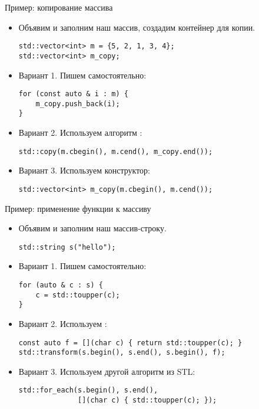 \documentclass{beamer}
\begin{document}
\begin{frame}[fragile]{Пример: копирование массива}
    \begin{itemize}
        \item Объявим и заполним наш массив, создадим контейнер для копии.
            \begin{lstlisting}
std::vector<int> m = {5, 2, 1, 3, 4};
std::vector<int> m_copy;
            \end{lstlisting}
        \item Вариант 1. Пишем самостоятельно:
            \begin{lstlisting}
for (const auto & i : m) {
    m_copy.push_back(i);
}
            \end{lstlisting}
        \item Вариант 2. Используем алгоритм :
            \begin{lstlisting}
std::copy(m.cbegin(), m.cend(), m_copy.end());
            \end{lstlisting}
        \item Вариант 3. Используем конструктор:
            \begin{lstlisting}
std::vector<int> m_copy(m.cbegin(), m.cend());
            \end{lstlisting}
    \end{itemize}
\end{frame}

\begin{frame}[fragile]{Пример: применение функции к массиву}
    \begin{itemize}
        \item Объявим и заполним наш массив-строку.
            \begin{lstlisting}
std::string s("hello");
            \end{lstlisting}
        \item Вариант 1. Пишем самостоятельно:
            \begin{lstlisting}
for (auto & c : s) {
    c = std::toupper(c);
}
            \end{lstlisting}
        \item Вариант 2. Используем :
            \begin{lstlisting}
const auto f = [](char c) { return std::toupper(c); }
std::transform(s.begin(), s.end(), s.begin(), f);
            \end{lstlisting}
        \item Вариант 3. Используем другой алгоритм из STL:
            \begin{lstlisting}
std::for_each(s.begin(), s.end(),
              [](char c) { std::toupper(c); });
            \end{lstlisting}
    \end{itemize}
\end{frame}
\end{document}
